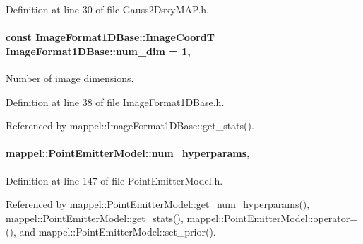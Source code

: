 Definition at line 30 of file Gauss2\+Dsxy\+M\+A\+P.\+h.

\paragraph[{\texorpdfstring{num\+\_\+dim}{num_dim}}]{\setlength{\rightskip}{0pt plus 5cm}const {\bf Image\+Format1\+D\+Base\+::\+Image\+CoordT} Image\+Format1\+D\+Base\+::num\+\_\+dim = 1\hspace{0.3cm}{\ttfamily [static]}, {\ttfamily [inherited]}}\hypertarget{classmappel_1_1ImageFormat1DBase_af81159de9010c3618d2f69349c1f2368}{}\label{classmappel_1_1ImageFormat1DBase_af81159de9010c3618d2f69349c1f2368}
Number of image dimensions. 

Definition at line 38 of file Image\+Format1\+D\+Base.\+h.



Referenced by mappel\+::\+Image\+Format1\+D\+Base\+::get\+\_\+stats().

\paragraph[{\texorpdfstring{num\+\_\+hyperparams}{num_hyperparams}}]{ mappel\+::\+Point\+Emitter\+Model\+::num\+\_\+hyperparams\hspace{0.3cm}{\ttfamily [protected]}, {\ttfamily [inherited]}}\hypertarget{classmappel_1_1PointEmitterModel_ab2423214fdd81c8212118770b5b17b1f}{}\label{classmappel_1_1PointEmitterModel_ab2423214fdd81c8212118770b5b17b1f}


Definition at line 147 of file Point\+Emitter\+Model.\+h.



Referenced by mappel\+::\+Point\+Emitter\+Model\+::get\+\_\+num\+\_\+hyperparams(), mappel\+::\+Point\+Emitter\+Model\+::get\+\_\+stats(), mappel\+::\+Point\+Emitter\+Model\+::operator=(), and mappel\+::\+Point\+Emitter\+Model\+::set\+\_\+prior().

